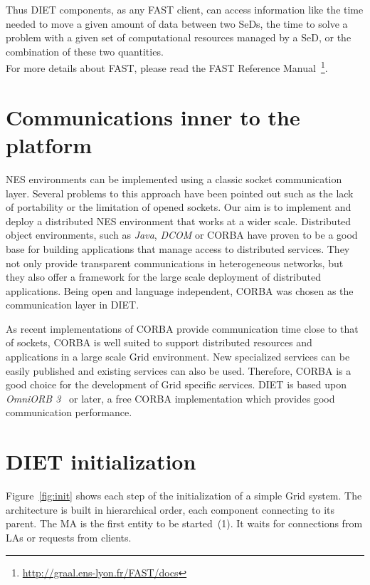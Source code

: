 Thus DIET components, as any FAST client, can access information like the time
needed to move a given amount of data between two SeDs, the time to solve a
problem with a given set of computational resources managed by a SeD, or the
combination of these two quantities.\\

For more details about FAST, please read the FAST Reference Manual~\footnote{\url{http://graal.ens-lyon.fr/FAST/docs}}.


\section{Communications inner to the platform}
\label{sec:CORBA}

NES environments can be implemented using a classic socket
communication layer.  Several problems to this approach have been
pointed out such as the lack of portability or the limitation of
opened sockets. Our aim is to implement and deploy a distributed NES
environment that works at a wider scale. Distributed object
environments, such as \emph{Java}, \emph{DCOM} or CORBA have proven to
be a good base for building applications that manage access to
distributed services. They not only provide transparent communications
in heterogeneous networks, but they also offer a framework for the
large scale deployment of distributed applications. Being open and
language independent, CORBA was chosen as the communication layer in
DIET.

As recent implementations of CORBA provide communication time close to
that of sockets, CORBA is well suited to support distributed resources
and applications in a large scale Grid environment. New specialized
services can be easily published and existing services can also be
used.  Therefore, CORBA is a good choice for the
development of Grid specific services. DIET is based upon
\emph{OmniORB 3}~\cite{OMNIORB} or later, a free CORBA implementation
which provides good communication performance.


\section{DIET initialization}
\label{init}

Figure~\ref{fig:init} shows each step of the initialization of a simple Grid
system. The architecture is built in hierarchical order, each component
connecting to its parent. The MA is the first entity to be started~(1). It waits
for connections from LAs or requests from clients.

